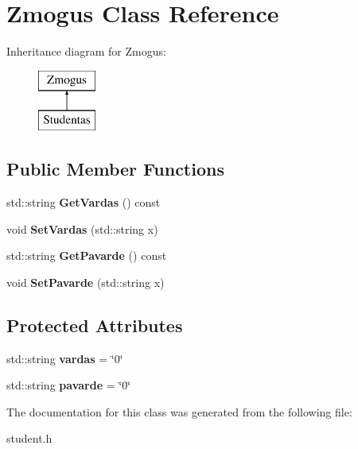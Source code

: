 \hypertarget{class_zmogus}{}\section{Zmogus Class Reference}
\label{class_zmogus}
Inheritance diagram for Zmogus\+:\begin{figure}[H]
\begin{center}
\leavevmode
\includegraphics[height=2.000000cm]{class_zmogus}
\end{center}
\end{figure}
\subsection*{Public Member Functions}
\begin{DoxyCompactItemize}
\item 
\mbox{\label{class_zmogus_a1cd263a6eca371513e7a3383ecede2c1}} 
std\+::string {\bfseries Get\+Vardas} () const
\item 
\mbox{\label{class_zmogus_a9338519d38227b164c333438fd12c513}} 
void {\bfseries Set\+Vardas} (std\+::string x)
\item 
\mbox{\label{class_zmogus_aa52760317c00a7174d8bfad2e4f7e965}} 
std\+::string {\bfseries Get\+Pavarde} () const
\item 
\mbox{\label{class_zmogus_ace7f7355c7995245737473fd3db32b54}} 
void {\bfseries Set\+Pavarde} (std\+::string x)
\end{DoxyCompactItemize}
\subsection*{Protected Attributes}
\begin{DoxyCompactItemize}
\item 
\mbox{\label{class_zmogus_a4d456bf4fea70f08e0b26517576cfbc0}} 
std\+::string {\bfseries vardas} = \char`\"{}0\char`\"{}
\item 
\mbox{\label{class_zmogus_a99cc96defe5d014db052cc754e989b16}} 
std\+::string {\bfseries pavarde} = \char`\"{}0\char`\"{}
\end{DoxyCompactItemize}


The documentation for this class was generated from the following file\+:\begin{DoxyCompactItemize}
\item 
student.\+h\end{DoxyCompactItemize}
